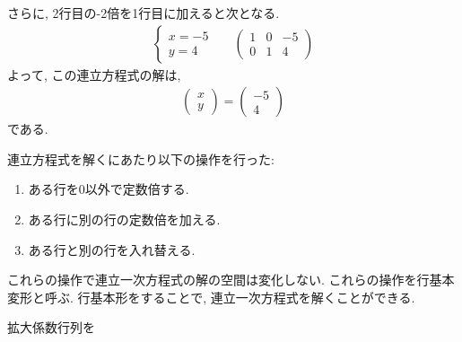 さらに,
2行目の-2倍を1行目に加えると次となる.
\begin{align*}
  \begin{cases}
    x=-5\\
     y=4
  \end{cases}&&
  \begin{pmatrix}
    1&0&-5\\    
    0&1&4
  \end{pmatrix}
\end{align*}
よって,
この連立方程式の解は,
\begin{align*}
  \begin{pmatrix}
    x\\y
  \end{pmatrix}  
  =
  \begin{pmatrix}
    -5\\4
  \end{pmatrix}  
\end{align*}
である.

連立方程式を解くにあたり以下の操作を行った:
\begin{enumerate}
  \item ある行を$0$以外で定数倍する.
  \item ある行に別の行の定数倍を加える.
  \item ある行と別の行を入れ替える.
\end{enumerate}
これらの操作で連立一次方程式の解の空間は変化しない.
これらの操作を行基本変形と呼ぶ.
行基本形をすることで, 連立一次方程式を解くことができる.



拡大係数行列を

